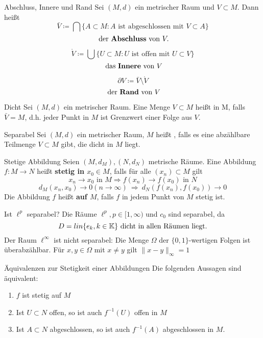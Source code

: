 	\begin{karte}{Abschluss, Innere und Rand}
		Sei $(M, d)$ ein metrischer Raum und $V \subset M$. Dann hei{\ss}t 
		\[ \bar V \coloneqq \bigcap \{ A \subset M: A \text{ ist abgeschlossen mit } V \subset A \} \] \[ \text{ der \begriff{Abschluss} von }V. \]
		
		\[ \mathring V \coloneqq \bigcup \{ U \subset M: U \text{ ist offen mit } U \subset V \} \] \[ \text{ das \begriff{Innere} von } V \] 
		
		\[ \partial V \coloneqq \bar V \setminus \mathring V \] \[ \text{ der \begriff{Rand} von }V \]
	\end{karte}
	
	\begin{karte}{Dicht}	
		Sei $(M, d)$ ein metrischer Raum. Eine Menge $V \subset M$ hei{\ss}t  in M, falls $\bar V = M$, d.h. jeder Punkt in $M$ ist Grenzwert einer Folge aus $V$.
	\end{karte}	

	\begin{karte}{Separabel}		
		Sei $(M, d)$ ein metrischer Raum, $M$ hei{\ss}t , falls es eine abzählbare Teilmenge $V \subset M$ gibt, die dicht in $M$ liegt.
	\end{karte}
	
	\begin{karte}{Stetige Abbildung}
			Seien $(M, d_{M}), (N, d_{N})$ metrische Räume. Eine Abbildung $f \colon M \rightarrow N$ hei{\ss}t \textbf{stetig in $x_{0} \in M$}, falls für alle $(x_{n}) \subset M$ gilt
		\[ x_{n} \rightarrow x_{0} \text{ in } M \Rightarrow f(x_{n}) \rightarrow f(x_{0}) \text{ in } N \]
		\[ d_{M}(x_{n}, x_{0}) \rightarrow 0 (n \rightarrow \infty) ~ \Rightarrow ~ d_{N}(f(x_{n}), f(x_{0})) \rightarrow 0 \]
		Die Abbildung $f$ hei{\ss}t  \textbf{auf $M$}, falls $f$ in jedem Punkt von $M$ stetig ist.	
	\end{karte}

	\begin{karte}{Ist $\ell^{p}$ separabel?}	
		Die Räume $\ell^{p}, p \in [1, \infty)$ und $c_{0}$ sind separabel, da
			\[ D = lin \{ e_{k}, k \in \mathbb{K} \} \text{ dicht in allen Räumen liegt.} \]
		Der Raum $\ell^{\infty}$ ist nicht separabel: 
			Die Menge $\Omega$ der $\{0, 1\}$-wertigen Folgen ist überabzählbar. Für $x, y \in \Omega$ mit $x \neq y$ gilt $\| x - y \|_{\infty} = 1$
	\end{karte}
	
	\begin{karte}{Äquivalenzen zur Stetigkeit einer Abbildungen}		
		Die folgenden Aussagen sind äquivalent:
			\begin{enumerate}[label=(\roman*\upshape)]
				\item $f$ ist stetig auf $M$
				\item Ist $U \subset N$ offen, so ist auch $f^{-1}(U)$ offen in $M$
				\item Ist $A \subset N$ abgeschlossen, so ist auch $f^{-1}(A)$ abgeschlossen in $M$.
			\end{enumerate}
	\end{karte}